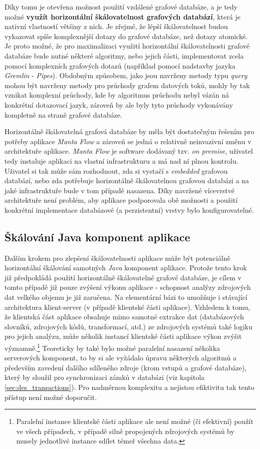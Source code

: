 Díky tomu je otevřena možnost použití vzdálené grafové databáze, a je tedy možné \textbf{využít horizontální škálovatelnost grafových databází}, která je nativní vlastností většiny z nich. Je zřejmé, že lépší škálovatelnost budou vykazovat spíše komplexnější dotazy do grafové databáze, než dotazy atomické. Je proto možné, že pro maximalizaci využití horizontální škálovatelnosti grafové databáze bude nutné některé algoritmy, nebo jejich části, implementovat zcela pomocí komplexních grafových dotazů (například pomocí nadstavby jazyka \textit{Gremlin} - \textit{Pipes}). Obdobným způsobem, jako jsou navrženy metody typu \textit{query} mohou být navrženy metody pro průchody grafem datových toků, mohly by tak vznikat komplexní průchody, kde by algoritmus průchodu nebyl vázán ná konkrétní dotazovací jazyk, zároveň by ale byly tyto průchody vykonávány kompletně na straně grafové databáze.

Horizontálně škálovatelná grafová databáze by měla být dostatečným řešením pro potřeby aplikace \textit{Manta Flow} a zároveň se jedná o relativně neinvazivní změnu v architektuře aplikace. \textit{Manta Flow} je software dodávaný tzv. \textit{on premise}, uživatel tedy instaluje aplikaci na vlastní infrastrukturu a má nad ní plnou kontrolu. Uživatel si tak může sám rozhodnout, zda si vystačí s \textit{embedded} grafovou databází, nebo zda potřebuje horizontálně škálovatelnou grafovou databázi a na jaké infrastruktuře bude v tom případě nasazena. Díky navržené vícevrstvé architektuře není problém, aby aplikace podporovala obě možnosti a použití konkrétní implementace databázové (a perzistentní) vrstvy bylo konfigurovatelné.


\subsection{Škálování Java komponent aplikace}
\label{sec:des_scaling_java}
Dalším krokem pro zlepšení škálovatelnosti aplikace může být potenciálně horizontální škálování samotných \textit{Java} komponent aplikace. Protože tento krok již předpokládá použití horizontálně škálovatelné grafové databáze, je cílem v tomto případě již pouze zvýšení výkonu aplikace - schopnost analýzy zdrojových dat velkého objemu je již zaručena. Na elementární bázi to umožňuje i stávající architektura klient-server (v případě klientské části aplikace). Vzhledem k tomu, že klientská část aplikace obsahuje mimo samotné extrakce dat (databázových slovníků, zdrojových kódů, transformací, atd.) ze zdrojových systémů také logiku pro jejich analýzu, může několik instancí klientské části aplikace výkon zvýšit významně.\footnote{Paralelní instance klientské části aplikace ale není možné (či efektivní) použít ve všech případech, v případě silně propojených zdrojových systémů by musely jednotlivé instance sdílet témeř všechna data.} Teoreticky by také bylo možné paralelní nasazení několika serverových komponent, to by si ale vyžádalo úpravu některých algoritmů a především zavedení dalšího sdíleného zdroje (krom vstupů a grafové databáze), který by sloužil pro synchronizaci zámků v databázi (viz kapitola \ref{sec:des_transactions}). Pro nadměrnou komplexitu a nejistou efiktivitu tak tento přístup není možné doporučit.

